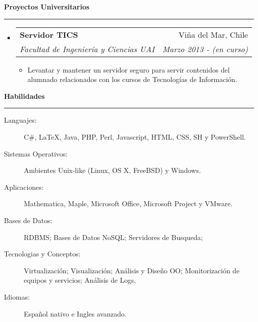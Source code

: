 \documentclass[letterpaper,11pt]{article}
\makeatletter
\newcommand{\resitem}[1]{\item #1 \vspace{-2pt}}
\newcommand{\ressubheading}[4]{
\begin{tabular*}{6.5in}{l@{\extracolsep{\fill}}r}
		\textbf{#1} & #2 \\
		\textit{#3} & \textit{#4} \\
\end{tabular*}\vspace{-6pt}}
\makeatother
\begin{document}
\vspace{0.4in}

\large{\textbf{Proyectos Universitarios}} \normalsize
\hrule
\begin{itemize}
\item
	\ressubheading{Servidor TICS}{Viña del Mar, Chile}{Facultad de Ingeniería y Ciencias UAI}{Marzo 2013 - (en curso)}
	\begin{itemize}
		\resitem{Levantar y mantener un servidor seguro para servir contenidos del alumnado relacionados con los cursos de Tecnologías de Información.}
	\end{itemize}
\end{itemize}

\vspace{0.4in}

\newpage

\large{\textbf{Habilidades}} \normalsize
\vspace{0.035in}
\hrule
\begin{description}
\item[Languajes:]
C\#, LaTeX, Java, PHP, Perl, Javascript, HTML, CSS, SH y PowerShell.
\item[Sistemas Operativos:]
Ambientes Unix-like (Linux, OS X, FreeBSD) y Windows.
\item[Aplicaciones:]
Mathematica, Maple, Microsoft Office, Microsoft Project y VMware.
\item[Bases de Datos:]
RDBMS; Bases de Datos NoSQL; Servidores de Busqueda;
\item[Tecnologias y Conceptos:]
Virtualización; Visualización; Análisis y Diseño OO; Monitorización de equipos y servicios; Análisis de Logs.
\item[Idiomas:]
Español nativo e Ingles avanzado.
\end{description}
\end{document}

